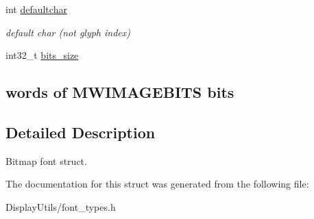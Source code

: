 \begin{DoxyCompactItemize}
\mbox{\label{structfont__descriptor__t_a5bfad8f5e932dee64c856bce858f88d0}} 
int \mbox{\hyperlink{structfont__descriptor__t_a5bfad8f5e932dee64c856bce858f88d0}{defaultchar}}
\begin{DoxyCompactList}\small\item\em default char (not glyph index) \end{DoxyCompactList}\item 
\mbox{\label{structfont__descriptor__t_a335c226d88f77b41d82ed53d6d28c022}} 
int32\+\_\+t \mbox{\hyperlink{structfont__descriptor__t_a335c226d88f77b41d82ed53d6d28c022}{bits\+\_\+size}}
\begin{DoxyCompactList}\small\item\em \subsection*{words of M\+W\+I\+M\+A\+G\+E\+B\+I\+TS bits}\end{DoxyCompactList}\end{DoxyCompactItemize}


\subsection{Detailed Description}
Bitmap font struct. 

The documentation for this struct was generated from the following file\+:\begin{DoxyCompactItemize}
\item 
Display\+Utils/font\+\_\+types.\+h\end{DoxyCompactItemize}
